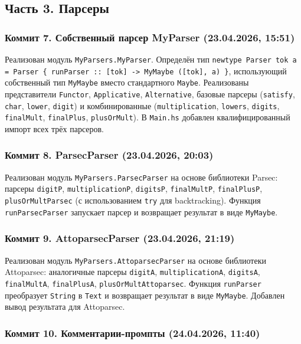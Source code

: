 \documentclass[a4paper, final]{article}
\begin{document}
\subsection{Часть 3. Парсеры}

\subsubsection{Коммит 7. Собственный парсер MyParser (23.04.2026, 15:51)}

Реализован модуль \texttt{MyParsers.MyParser}. Определён тип
\texttt{newtype Parser tok a = Parser \{ runParser :: [tok] -> MyMaybe ([tok], a) \}},
использующий собственный тип \texttt{MyMaybe} вместо стандартного
\texttt{Maybe}. Реализованы представители \texttt{Functor},
\texttt{Applicative}, \texttt{Alternative}, базовые парсеры
(\texttt{satisfy}, \texttt{char}, \texttt{lower}, \texttt{digit}) и
комбинированные (\texttt{multiplication}, \texttt{lowers}, \texttt{digits},
\texttt{finalMult}, \texttt{finalPlus}, \texttt{plusOrMult}). В
\texttt{Main.hs} добавлен квалифицированный импорт всех трёх парсеров.

\subsubsection{Коммит 8. ParsecParser (23.04.2026, 20:03)}

Реализован модуль \texttt{MyParsers.ParsecParser} на основе библиотеки
Parsec: парсеры \texttt{digitP}, \texttt{multiplicationP}, \texttt{digitsP},
\texttt{finalMultP}, \texttt{finalPlusP}, \texttt{plusOrMultParsec} (с
использованием \texttt{try} для backtracking). Функция
\texttt{runParsecParser} запускает парсер и возвращает результат в виде
\texttt{MyMaybe}.

\subsubsection{Коммит 9. AttoparsecParser (23.04.2026, 21:19)}

Реализован модуль \texttt{MyParsers.AttoparsecParser} на основе библиотеки
Attoparsec: аналогичные парсеры \texttt{digitA}, \texttt{multiplicationA},
\texttt{digitsA}, \texttt{finalMultA}, \texttt{finalPlusA},
\texttt{plusOrMultAttoparsec}. Функция \texttt{runParser} преобразует
\texttt{String} в \texttt{Text} и возвращает результат в виде \texttt{MyMaybe}.
Добавлен вывод результата для Attoparsec.

\subsubsection{Коммит 10. Комментарии-промпты (24.04.2026, 11:40)}
\end{document}
